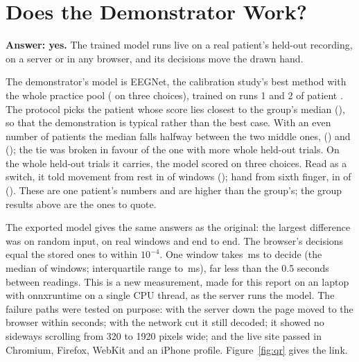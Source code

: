 \section{Does the Demonstrator Work?}\label{sec:res-demo}

\textbf{Answer: yes.} The trained model runs live on a real patient's held-out recording,
on a server or in any browser, and its decisions move the drawn hand.

The demonstrator's model is EEGNet, the calibration study's best method with the whole
practice pool (\pct{\demoChoiceEegnetScratchMean} on three choices), trained on runs 1 and 2
of patient \demoSubject. The protocol picks the patient whose score lies closest to the
group's median (\pct{\demoCohortMedianAcc}), so that the demonstration is typical rather
than the best case. With an even number of patients the median falls halfway between the
two middle ones, \demoSubject{} (\pct{\demoChosenByAcc}) and \demoTieSubject{}
(\pct{\demoTieAcc}); the tie was broken in favour of the one with more whole held-out
trials. On the
\demoTrials{} whole held-out trials it carries, the model scored \pct{\demoHeldOutAcc} on
three choices. Read as a switch, it told movement from rest in \demoMoveRestRight{} of
\demoMoveRestN{} windows (\pct{\demoMoveRestAcc}); hand from sixth finger, in
\demoHandFingerRight{} of \demoHandFingerN{} (\pct{\demoHandFingerAcc}). These are one
patient's numbers and are higher than the group's; the group results above are the ones
to quote.

The exported model gives the same answers as the original: the largest difference was
\demoParityRandom{} on random input, \demoParityReal{} on real windows and
\demoParityMethod{} end to end. The browser's decisions equal the stored ones to within
$10^{-4}$. One window takes \demoInferenceMedianMs{}\,ms to decide (the median of
\demoInferenceN{} windows; interquartile range \demoInferenceIqrLoMs{} to
\demoInferenceIqrHiMs{}\,ms), far less than the 0.5 seconds between readings. This is a new
measurement, made for this report on an \demoInferenceMachine{} laptop with onnxruntime
\demoInferenceOnnxruntimeVersion{} on a single CPU thread, as the server runs the model.
The failure paths were tested on purpose: with the
server down the page moved to the browser within seconds; with the network cut it still
decoded; it showed no sideways scrolling from 320 to 1920 pixels wide; and the live site
passed in Chromium, Firefox, WebKit and an iPhone profile. Figure~\ref{fig:qr} gives the
link.


